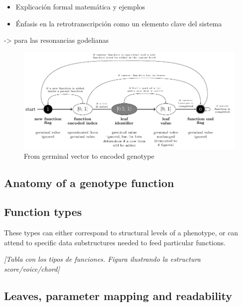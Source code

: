 \documentclass{article}
\begin{document}
{\color{gray}
\begin{itemize}
\item Explicación formal matemática y ejemplos
\item Énfasis en la retrotranscripción como un elemento clave del sistema
\end{itemize}
}


{\color{red}

\cite{deLemosAlmada2017} -> para las resonancias godelianas

\begin{figure}[H]
  \includegraphics[width=\linewidth]{figs/germinal_vector_to_encoded_genotype_coding/germinal_vector_to_encoded_genotype_coding.pdf}
  \caption{From germinal vector to encoded genotype}
  \label{fig:fromGerminalToEncGen}
\end{figure}

}





\subsection{Anatomy of a genotype function}

\subsection{Function types}


These types can either correspond to structural levels of a phenotype, or can attend to specific data substructures needed to feed particular functions.

{\color{gray} \textsl{[Tabla con los tipos de funciones. Figura ilustrando la estructura score/voice/chord]}}

\subsection{Leaves, parameter mapping and readability}
\end{document}

